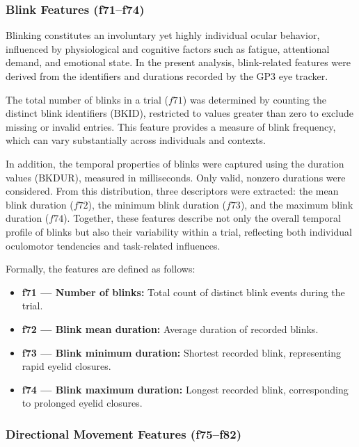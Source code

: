 \documentclass{article}
\begin{document}
\subsubsection{Blink Features (f71–f74)}

Blinking constitutes an involuntary yet highly individual ocular behavior, influenced by physiological and cognitive factors such as fatigue, attentional demand, and emotional state. 
In the present analysis, blink-related features were derived from the identifiers and durations recorded by the GP3 eye tracker.

The total number of blinks in a trial (\(f71\)) was determined by counting the distinct blink identifiers (\(\mathrm{BKID}\)), restricted to values greater than zero to exclude missing or invalid entries. 
This feature provides a measure of blink frequency, which can vary substantially across individuals and contexts.

In addition, the temporal properties of blinks were captured using the duration values (\(\mathrm{BKDUR}\)), measured in milliseconds. 
Only valid, nonzero durations were considered. 
From this distribution, three descriptors were extracted: the mean blink duration (\(f72\)), the minimum blink duration (\(f73\)), and the maximum blink duration (\(f74\)). 
Together, these features describe not only the overall temporal profile of blinks but also their variability within a trial, reflecting both individual oculomotor tendencies and task-related influences.

Formally, the features are defined as follows:

\begin{itemize}
    \item \textbf{f71 — Number of blinks:} Total count of distinct blink events during the trial.
    \item \textbf{f72 — Blink mean duration:} Average duration of recorded blinks.
    \item \textbf{f73 — Blink minimum duration:} Shortest recorded blink, representing rapid eyelid closures.
    \item \textbf{f74 — Blink maximum duration:} Longest recorded blink, corresponding to prolonged eyelid closures.
\end{itemize}

\subsubsection{Directional Movement Features (f75–f82)}
\end{document}
